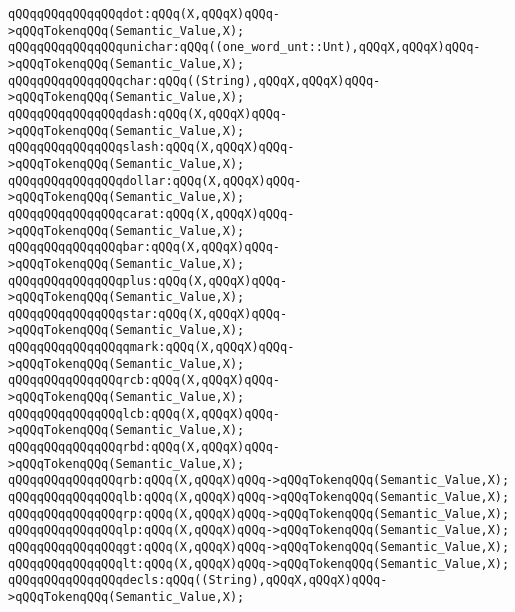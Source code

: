 \verb|qQQqqQQqqQQqqQQqdot:qQQq(X,qQQqX)qQQq->qQQqTokenqQQq(Semantic_Value,X);|\newline
\verb|qQQqqQQqqQQqqQQqunichar:qQQq((one_word_unt::Unt),qQQqX,qQQqX)qQQq->qQQqTokenqQQq(Semantic_Value,X);|\newline
\verb|qQQqqQQqqQQqqQQqchar:qQQq((String),qQQqX,qQQqX)qQQq->qQQqTokenqQQq(Semantic_Value,X);|\newline
\verb|qQQqqQQqqQQqqQQqdash:qQQq(X,qQQqX)qQQq->qQQqTokenqQQq(Semantic_Value,X);|\newline
\verb|qQQqqQQqqQQqqQQqslash:qQQq(X,qQQqX)qQQq->qQQqTokenqQQq(Semantic_Value,X);|\newline
\verb|qQQqqQQqqQQqqQQqdollar:qQQq(X,qQQqX)qQQq->qQQqTokenqQQq(Semantic_Value,X);|\newline
\verb|qQQqqQQqqQQqqQQqcarat:qQQq(X,qQQqX)qQQq->qQQqTokenqQQq(Semantic_Value,X);|\newline
\verb|qQQqqQQqqQQqqQQqbar:qQQq(X,qQQqX)qQQq->qQQqTokenqQQq(Semantic_Value,X);|\newline
\verb|qQQqqQQqqQQqqQQqplus:qQQq(X,qQQqX)qQQq->qQQqTokenqQQq(Semantic_Value,X);|\newline
\verb|qQQqqQQqqQQqqQQqstar:qQQq(X,qQQqX)qQQq->qQQqTokenqQQq(Semantic_Value,X);|\newline
\verb|qQQqqQQqqQQqqQQqqmark:qQQq(X,qQQqX)qQQq->qQQqTokenqQQq(Semantic_Value,X);|\newline
\verb|qQQqqQQqqQQqqQQqrcb:qQQq(X,qQQqX)qQQq->qQQqTokenqQQq(Semantic_Value,X);|\newline
\verb|qQQqqQQqqQQqqQQqlcb:qQQq(X,qQQqX)qQQq->qQQqTokenqQQq(Semantic_Value,X);|\newline
\verb|qQQqqQQqqQQqqQQqrbd:qQQq(X,qQQqX)qQQq->qQQqTokenqQQq(Semantic_Value,X);|\newline
\verb|qQQqqQQqqQQqqQQqrb:qQQq(X,qQQqX)qQQq->qQQqTokenqQQq(Semantic_Value,X);|\newline
\verb|qQQqqQQqqQQqqQQqlb:qQQq(X,qQQqX)qQQq->qQQqTokenqQQq(Semantic_Value,X);|\newline
\verb|qQQqqQQqqQQqqQQqrp:qQQq(X,qQQqX)qQQq->qQQqTokenqQQq(Semantic_Value,X);|\newline
\verb|qQQqqQQqqQQqqQQqlp:qQQq(X,qQQqX)qQQq->qQQqTokenqQQq(Semantic_Value,X);|\newline
\verb|qQQqqQQqqQQqqQQqgt:qQQq(X,qQQqX)qQQq->qQQqTokenqQQq(Semantic_Value,X);|\newline
\verb|qQQqqQQqqQQqqQQqlt:qQQq(X,qQQqX)qQQq->qQQqTokenqQQq(Semantic_Value,X);|\newline
\verb|qQQqqQQqqQQqqQQqdecls:qQQq((String),qQQqX,qQQqX)qQQq->qQQqTokenqQQq(Semantic_Value,X);|\newline
